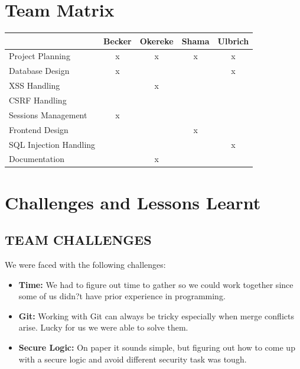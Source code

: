 \documentclass[12pt,a4paper]{article}
\begin{document}
\begin{flushleft}
\begin{itemize}
	\end{itemize}
	
	
	\section {Team Matrix}
	\begin{tabular}{|l|c|c|c|c|}
		\hline
		 & Becker & Okereke & Shama & Ulbrich \\ \hline
		 Project Planning & x & x & x & x \\ \hline
		 Database Design & x &  &  & x \\ \hline
		 XSS Handling &  & x &  &  \\ \hline
		 CSRF Handling &  &  &  &  \\ \hline
		 Sessions Management & x &  &  &  \\ \hline
		 Frontend Design &  &  & x &  \\ \hline
		 SQL Injection Handling &  &  &  & x \\ \hline
		 Documentation &  & x &  &  \\ \hline
	\end{tabular}
	
	\end{flushleft}
	
	
	
	
	\section{Challenges and Lessons Learnt}
	\subsection{TEAM CHALLENGES}
	\begin{flushleft}
	
		We were faced with the following challenges:
		\begin{itemize}
			\item \textbf{Time:} We had to figure out time to gather so we could work together since some of us didn?t have prior
			experience in programming.
			\item \textbf{Git:} Working with Git can always be tricky especially when merge conflicts arise. Lucky for us we were able to solve them.
			\item \textbf{Secure Logic:} On paper it sounds simple, but figuring out how to come up with a secure logic and avoid different security task was tough.
		\end{itemize}
		
	\end{flushleft}
	
\end{document}
